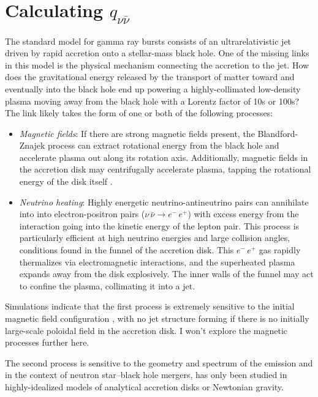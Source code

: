 \section{Calculating $q_{\nu \bar{\nu}}$}
\label{sec:q_algorithm}
The standard model for gamma ray bursts consists of an ultrarelativistic jet
driven by rapid accretion onto a stellar-mass black hole. One of the missing
links in this model is the physical mechanism connecting the accretion to the
jet. How does the gravitational energy released by the transport of matter
toward and eventually into the black hole end up powering a highly-collimated
low-density plasma moving away from the black hole with a Lorentz factor of
10s or 100s? The link likely takes the form of one or both of the following
processes:
\begin{itemize}
  \item \emph{Magnetic fields}: If there are strong magnetic fields present, the
    Blandford-Znajek process \citep{blan1977-blandford_znajek} can extract
    rotational energy from the black hole and accelerate plasma out along its
    rotation axis. Additionally, magnetic fields in the accretion disk may
    centrifugally accelerate plasma, tapping the rotational energy of the
    disk itself \citep{blan1982-blandford_payne}.
  \item \emph{Neutrino heating}: Highly energetic neutrino-antineutrino pairs
    can annihilate into into electron-positron pairs
    ($\nu \, \bar{\nu} \rightarrow e^{-} \, e^{+}$)
    with excess energy from the interaction going into the kinetic energy of the
    lepton pair.
    This process is particularly efficient at high neutrino energies and large
    collision angles, conditions found in the funnel of the accretion disk.
    This $e^{-}\,e^{+}$ gas rapidly thermalizes via electromagnetic interactions,
    and the superheated plasma expands away from the disk explosively. The inner
    walls of the funnel may act to confine the plasma, collimating it into a jet.
\end{itemize}

Simulations indicate that the first process is extremely sensitive to the
initial magnetic field configuration \citep{beck2008-mag_geometry},
with no jet structure forming if there is
no initially large-scale poloidal field in the accretion disk.
I won't explore the magnetic processes further here.

The second process is sensitive to the geometry and spectrum of the emission
and in the context of neutron star--black hole mergers, has only been studied
in highly-idealized models of analytical accretion disks or Newtonian gravity.

